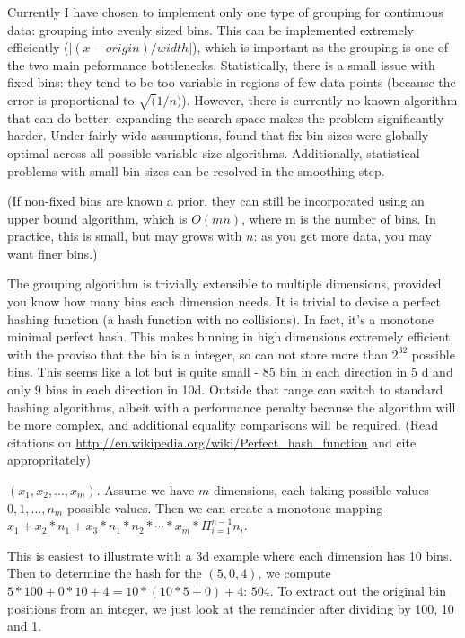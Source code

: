 \documentclass[journal]{vgtc}                %
\begin{document}
Currently I have chosen to implement only one type of grouping for continuous data: grouping into evenly sized bins.  This can be implemented extremely efficiently ($\left | (x - origin) / width  \right |$), which is important as the grouping is one of the two main peformance bottlenecks. Statistically, there is a small issue with fixed bins: they tend to be too variable in regions of few data points (because the error is proportional to $\sqrt(1/n)$). However, there is currently no known algorithm that can do better: expanding the search space makes the problem significantly harder.  Under fairly wide assumptions, \cite{kogure:1987} found that fix bin sizes were globally optimal across all possible variable size algorithms.  Additionally, statistical problems with small bin sizes can be resolved in the smoothing step.

(If non-fixed bins are known a prior, they can still be incorporated using an upper bound algorithm, which is $O(mn)$, where m is the number of bins. In practice, this is small, but may grows with $n$: as you get more data, you may want finer bins.)


The grouping algorithm is trivially extensible to multiple dimensions, provided you know how many bins each dimension needs. It is trivial to devise a perfect hashing function (a hash function with no collisions). In fact, it's a monotone minimal perfect hash. This makes binning in high dimensions extremely efficient, with the proviso that the bin is a integer, so can not store more than $2^32$ possible bins.  This seems like a lot but is quite small - 85 bin in each direction in 5 d and only 9 bins in each direction in 10d.  Outside that range can switch to standard hashing algorithms, albeit with a performance penalty because the algorithm will be more complex, and additional equality comparisons will be required. (Read citations on \url{http://en.wikipedia.org/wiki/Perfect_hash_function} and cite appropritately)

$(x_1, x_2, \ldots, x_m)$. Assume we have $m$ dimensions, each taking possible values $0, 1, \ldots, n_m$ possible values.  Then we can create a monotone mapping $x_1 + x_2 * n_1 + x_3 * n_1 * n_2 * \cdots * x_m * \Pi^{n-1}_{i = 1} n_i$.

This is easiest to illustrate with a 3d example where each dimension has 10 bins.  Then to determine the hash for the $(5, 0, 4)$, we compute $5 * 100 + 0 * 10 + 4 = 10 * (10 * 5 + 0) + 4$: $504$. To extract out the original bin positions from an integer, we just look at the remainder after dividing by 100, 10 and 1.
\end{document}
